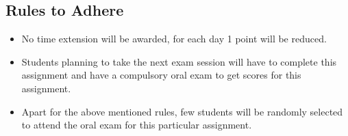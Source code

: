 \documentclass[12pt, a4paper]{article}
\begin{document}
\subsection*{Rules to Adhere}
\begin{itemize}
    \item No time extension will be awarded, for each day 1 point will be reduced. 
    \item Students planning to take the next exam session will have to complete this assignment and have a compulsory oral exam to get scores for this assignment.
    \item Apart for the above mentioned rules, few students will be randomly selected to attend the oral exam for this particular assignment. 
\end{itemize}



\end{document}
